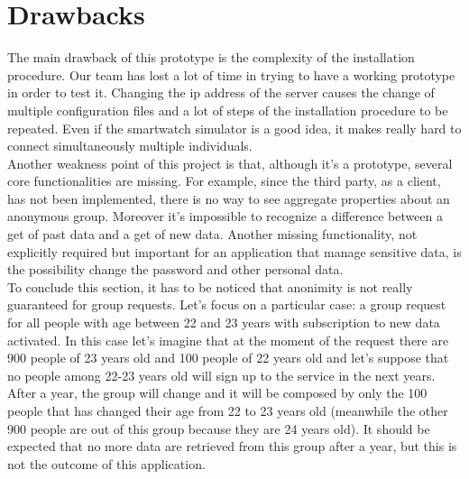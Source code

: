 \section{Drawbacks}
The main drawback of this prototype is the complexity of the installation procedure. Our team has lost a lot of time in trying to have a working prototype in order to test it. Changing the ip address of the server causes the change of multiple configuration files and a lot of steps of the installation procedure to be repeated. Even if the smartwatch simulator is a good idea, it makes really hard to connect simultaneously multiple individuals.\\
Another weakness point of this project is that, although it's a prototype, several core functionalities are missing. For example, since the third party, as a client, has not been implemented, there is no way to see aggregate properties about an anonymous group. Moreover it's impossible to recognize a difference between a get of past data and a get of new data. Another missing functionality, not explicitly required but important for an application that manage sensitive data, is the possibility change the password and other personal data.\\
To conclude this section, it has to be noticed that anonimity is not really guaranteed for group requests. Let's focus on a particular case: a group request for all people with age between 22 and 23 years with subscription to new data activated. In this case let's imagine that at the moment of the request there are 900 people of 23 years old and 100 people of 22 years old and let's suppose that no people among 22-23 years old will sign up to the service in the next years. After a year, the group will change and it will be composed by only the 100 people that has changed their age from 22 to 23 years old (meanwhile the other 900 people are out of this group because they are 24 years old). It should be expected that no more data are retrieved from this group after a year, but this is not the outcome of this application.